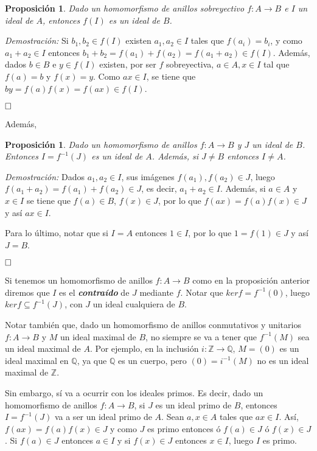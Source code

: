 \documentclass[12pt]{article}
\newtheorem{proposition}[theorem]{Proposición}
\begin{document}
\begin{proposition}Dado un homomorfismo de anillos sobreyectivo $f \colon A \longrightarrow B$ e $I$ un ideal de $A$, entonces $f(I)$ es un ideal de $B$.
\end{proposition}
\emph{Demostración: }Si $b_1, b_2 \in f(I)$ existen $a_1,a_2 \in I$ tales que $f(a_i)=b_i$, y como $a_1+a_2 \in I$ entonces $b_1+b_2 =f(a_1)+f(a_2)=f(a_1+a_2)\in f(I)$. Además, dados $b \in B$ e $y \in f(I)$ existen, por ser $f$ sobreyectiva, $a \in A, x \in I$ tal que $f(a)=b$ y $f(x)=y$. Como $ax \in I$, se tiene que $by = f(a)f(x) = f(ax) \in f(I)$.

$\hfill \square$

Además, 

\begin{proposition}\label{eq:idif} Dado un homomorfismo de anillos $f \colon A \longrightarrow B$ y $J$ un ideal de $B$. Entonces $I = f^{-1}(J)$ es un ideal de $A$. Además, si $J \neq B$ entonces $I \neq A$.
\end{proposition}
\emph{Demostración: }Dados $a_1, a_2 \in I$, sus imágenes $f(a_1), f(a_2) \in J$, luego $f(a_1+a_2)  = f(a_1)+f(a_2) \in J$, es decir, $a_1+a_2 \in I$. Además, si $a \in A$ y $x \in I$ se tiene que $f(a) \in B$, $f(x) \in J$, por lo que $f(ax)=f(a)f(x) \in J$ y así $ax \in I$.

Para lo último, notar que si $I = A$ entonces $1 \in I$, por lo que $1 = f(1) \in J$ y así $J=B$.

$\hfill \square$

Si tenemos un homomorfismo de anillos $f \colon A\longrightarrow B$ como en la proposición anterior diremos que $I$ es el \textbf{\textit{contraído}} de $J$ mediante $f$. Notar que $ker f = f^{-1}(0)$, luego $ker f \subseteq f^{-1}(J)$, con $J$ un ideal cualquiera de $B$.

Notar también que, dado un homomorfismo de anillos conmutativos y unitarios $f \colon A \longrightarrow B$ y $M$ un ideal maximal de $B$, no siempre se va a tener que $f^{-1}(M)$ sea un ideal maximal de $A$. Por ejemplo, en la inclusión $i \colon \mathbb{Z} \longrightarrow \mathbb{Q}$, $M = ( 0 )$ es un ideal maximal en $\mathbb{Q}$, ya que $\mathbb{Q}$ es un cuerpo, pero $( 0 ) = i^{-1}(M)$ no es un ideal maximal de $\mathbb{Z}$. 

Sin embargo, sí va a ocurrir con los ideales primos. Es decir, dado un homomorfismo de anillos $f \colon A \longrightarrow B$, si $J$ es un ideal primo de $B$, entonces $I = f^{-1}(J)$ va a ser un ideal primo de $A$. Sean $a,x \in A$ tales que $ax \in I$. Así, $f(ax)=f(a)f(x) \in J$ y como $J$ es primo entonces ó $f(a) \in J$ ó $f(x) \in J$. Si $f(a) \in J$ entonces $a \in I$ y si $f(x) \in J$ entonces $x \in I$, luego $I$ es primo. 
\end{document}
